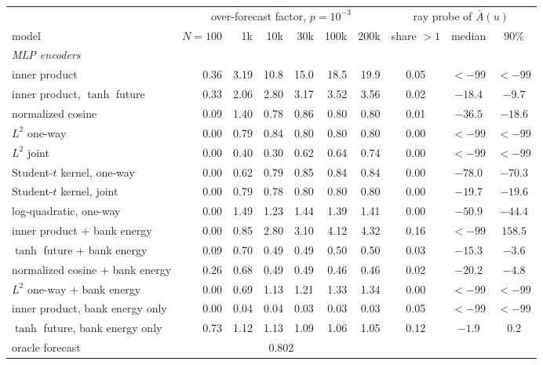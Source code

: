 \documentclass[11pt]{article}
\theoremstyle{plain}
\theoremstyle{definition}
\theoremstyle{remark}
\begin{document}
\begin{table}[ht]
 \centering
 \footnotesize
 \setlength{\tabcolsep}{3pt}
 \begin{tabular}{lrrrrrr|ccc}
  \toprule
        & \multicolumn{6}{c|}{over-forecast factor, $p=10^{-3}$} & \multicolumn{3}{c}{ray probe of $\bar A(u)$} \\
  model & $N=100$ & 1k & 10k & 30k & 100k & 200k & share $>1$ & median & $90\%$ \\
  \midrule
  \multicolumn{10}{l}{\emph{MLP encoders}} \\
  inner product & 0.36 & 3.19 & 10.8 & 15.0 & 18.5 & 19.9 & 0.05 & $<-99$ & $<-99$ \\
  inner product, $\tanh$ future & 0.33 & 2.06 & 2.80 & 3.17 & 3.52 & 3.56 & 0.02 & $-18.4$ & $-9.7$ \\
  normalized cosine & 0.09 & 1.40 & 0.78 & 0.86 & 0.80 & 0.80 & 0.01 & $-36.5$ & $-18.6$ \\
  $L^2$ one-way & 0.00 & 0.79 & 0.84 & 0.80 & 0.80 & 0.80 & 0.00 & $<-99$ & $<-99$ \\
  $L^2$ joint & 0.00 & 0.40 & 0.30 & 0.62 & 0.64 & 0.74 & 0.00 & $<-99$ & $<-99$ \\
  Student-$t$ kernel, one-way & 0.00 & 0.62 & 0.79 & 0.85 & 0.84 & 0.84 & 0.00 & $-78.0$ & $-70.3$ \\
  Student-$t$ kernel, joint & 0.00 & 0.79 & 0.78 & 0.80 & 0.80 & 0.80 & 0.00 & $-19.7$ & $-19.6$ \\
  log-quadratic, one-way & 0.00 & 1.49 & 1.23 & 1.44 & 1.39 & 1.41 & 0.00 & $-50.9$ & $-44.4$ \\
  inner product $+$ bank energy & 0.00 & 0.85 & 2.80 & 3.10 & 4.12 & 4.32 & 0.16 & $<-99$ & $158.5$ \\
  $\tanh$ future $+$ bank energy & 0.09 & 0.70 & 0.49 & 0.49 & 0.50 & 0.50 & 0.03 & $-15.3$ & $-3.6$ \\
  normalized cosine $+$ bank energy & 0.26 & 0.68 & 0.49 & 0.49 & 0.46 & 0.46 & 0.02 & $-20.2$ & $-4.8$ \\
  $L^2$ one-way $+$ bank energy & 0.00 & 0.69 & 1.13 & 1.21 & 1.33 & 1.34 & 0.00 & $<-99$ & $<-99$ \\
  inner product, bank energy only & 0.00 & 0.04 & 0.04 & 0.03 & 0.03 & 0.03 & 0.05 & $<-99$ & $<-99$ \\
  $\tanh$ future, bank energy only & 0.73 & 1.12 & 1.13 & 1.09 & 1.06 & 1.05 & 0.12 & $-1.9$ & $0.2$ \\
  \midrule
  oracle forecast & \multicolumn{6}{c}{0.802} & & & \\

\end{tabular}
\end{table}
\end{document}
